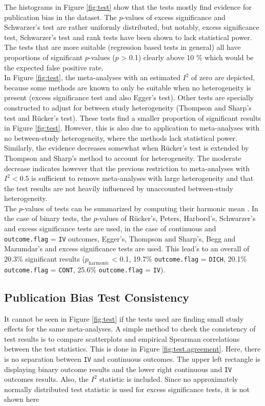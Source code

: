 \documentclass[11pt,a4paper,twoside]{book}\usepackage[]{graphicx}\usepackage[]{color}
\begin{document}
The histograms in Figure \ref{fig:test} show that the tests mostly find evidence for publication bias in the dataset. The $p$-values of excess significance and Schwarzer's test are rather uniformly distributed, but notably, excess significance test, Schwarzer's test and rank tests have been shown to lack statistical power. The tests that are more suitable (regression based tests in general) all have proportions of significant $p$-values ($p$ > 0.1) clearly above 10 \% which would be the expected false positive rate.\\
In Figure \ref{fig:test}, the meta-analyses with an estimated $I^2$ of zero are depicted, because some methods are known to only be suitable when no heterogeneity is present (excess significance test and also Egger's test). Other tests are specially constructed to adjust for between study heterogeneity (Thompson and Sharp's test and R\"ucker's test). These tests find a smaller proportion of significant results in Figure \ref{fig:test}. However, this is also due to application to meta-analyses with no between-study heterogeneity, where the methods lack statistical power. Similarly, the evidence decreases somewhat when R\"ucker's test is extended by Thompson and Sharp's method to account for heterogeneity. The moderate decrease indicates however that the previous restriction to meta-analyses with $I^2 < 0.5$ is sufficient to remove meta-analyses with large heterogeneity and that the test results are not heavily influenced by unaccounted between-study heterogeneity.\\
The $p$-values of tests can be summarized by computing their harmonic mean \citep{harmonic.p}. In the case of binary tests, the $p$-values of R\"ucker's, Peters, Harbord's, Schwarzer's and excess significance tests are used, in the case of continuous and \texttt{outcome.flag} = \texttt{IV} outcomes, Egger's, Thompson and Sharp's, Begg and Mazumdar's and excess significance tests are used. This lead's to an overall of 20.3\% significant results ($p_\textrm{harmonic}$ < 0.1, 19.7\% \texttt{outcome.flag} = \texttt{DICH}, 20.1\% \texttt{outcome.flag} = \texttt{CONT}, 25.6\% \texttt{outcome.flag} = \texttt{IV}).






\subsection{Publication Bias Test Consistency}
It cannot be seen in Figure \ref{fig:test} if the tests used are finding small study effects for the same meta-analyses. A simple method to check the consistency of test results is to compare scatterplots and empirical Spearman correlations between the test statistics. This is done in Figure \ref{fig:test.agreement}. Here, there is no separation between \texttt{IV} and continuous outcomes. The upper left rectangle is displaying binary outcome results and the lower right continuous and \texttt{IV} outcomes results. Also, the $I^2$ statistic is included. Since no approximately normally distributed test statistic is used for excess significance tests, it is not shown here
\end{document}
